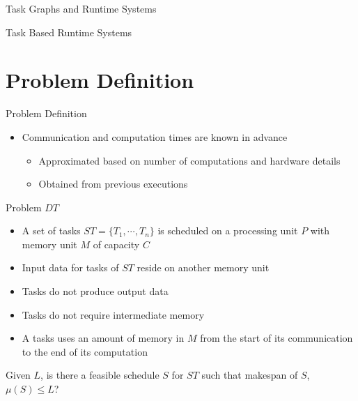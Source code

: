 \documentclass[mathserif,hyperref={pdfpagemode=FullScreen}]{beamer}
\begin{document}
\begin{frame}{Task Graphs and Runtime Systems}
\begin{block}{Task Based Runtime Systems}
\begin{itemize}
\end{itemize}
\end{block}

\end{frame}

\section{Problem Definition}
\begin{frame}{Problem Definition}
\begin{itemize}
	\item Communication and computation times are known in advance
	\begin{itemize}
		\item Approximated based on number of computations and hardware details
		\item Obtained from previous executions
	\end{itemize}
\end{itemize}
\begin{block}{Problem $DT$ }
	\begin{itemize}
		\item A set of tasks $ST=\{T_1, \cdots, T_n\}$ is scheduled on a processing unit $P$ with
		memory unit $M$ of capacity $C$
		\item Input data for tasks of $ST$
		reside on another memory unit
		\item Tasks do not produce output data
		\item Tasks do not require intermediate memory
		\item A tasks uses an amount of memory in $M$ from the
		start of its communication to the end of its computation
	\end{itemize}
\noindent Given $L$, is there a feasible schedule $S$ for $ST$ such that
makespan of $S$, $\mu(S) \le L$?
\end{block}

\end{frame}
\end{document}
